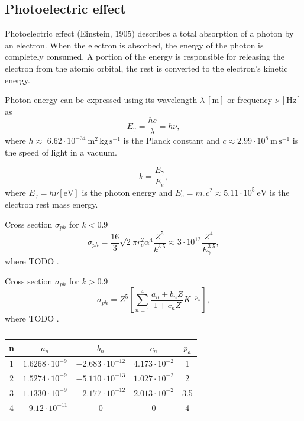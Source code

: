 \documentclass[a4paper,12pt,titlepage, twoside]{article}
\newcommand{\unit}[2]{$#1~\ensuremath{\mathrm{#2}}$}
\begin{document}


\subsection{Photoelectric effect}

Photoelectric effect (Einstein, 1905) describes a total absorption of a photon by an electron.
When the electron is absorbed, the energy of the photon is completely consumed.
A portion of the energy is responsible for releasing the electron from the atomic orbital, the rest is converted to the electron's kinetic energy.

Photon energy can be expressed using its wavelength \unit{\lambda}{\left[m\right]} or frequency \unit{\nu}{\left[Hz\right]} as
\begin{equation}
  E_{\gamma} = \frac{hc}{\lambda} = h\nu,
\end{equation}
where $h \approx $ \unit{6.62 \cdot 10^{-34}}{m^2\,kg\,s^{-1}} is the Planck constant and \unit{c \approx 2.99 \cdot 10^{8}}{m\,s^{-1}} is the speed of light in a vacuum.

\begin{equation}
  k = \frac{E_{\gamma}}{E_e},
\end{equation}
where $E_{\gamma} = h\nu \left[\mathrm{eV}\right]$ is the photon energy and \unit{E_e = m_ec^2 \approx 5.11 \cdot 10^5}{eV} is the electron rest mass energy.

Cross section $\sigma_{ph}$ for $k < 0.9$
\begin{equation}
  \sigma_{ph} = \frac{16}{3}\sqrt{2}\pi r_e^2\alpha^4\frac{Z^5}{k^{3.5}} \approx 3\cdot10^{12}\frac{Z^4}{E_{\gamma}^{3.5}},
\end{equation}
where {\color{red} TODO } \cite{davisson1965interaction}.

Cross section $\sigma_{ph}$ for $k > 0.9$
\begin{equation}
  \sigma_{ph} = Z^5\left[\sum_{n=1}^4 \frac{a_n + b_nZ}{1 + c_nZ}K^{-p_n}\right],
\end{equation}
where {\color{red} TODO } \cite{hubbell1980pair}.

\begin{table}
  \centering
  \begin{tabular}{c c c c c}
    \hline
    n & $a_n$ & $b_n$ & $c_n$ & $p_a$ \\
    \hline
    1 \rule{0pt}{2.3ex} & $1.6268 \cdot 10^{-9}$ & $-2.683 \cdot 10^{-12}$ & $4.173 \cdot 10^{-2}$ & 1 \\
    2 & $1.5274 \cdot 10^{-9}$ & $-5.110 \cdot 10^{-13}$ & $1.027 \cdot 10^{-2}$ & 2 \\
    3 & $1.1330 \cdot 10^{-9}$ & $-2.177 \cdot 10^{-12}$ & $2.013 \cdot 10^{-2}$ & 3.5 \\
    4 & $-9.12 \cdot 10^{-11}$ & 0 & 0 & 4\\
    \hline
  \end{tabular}
  \caption{\cite{hubbell1980pair}}
\end{table}
\end{document}
